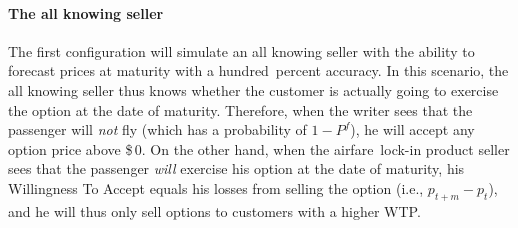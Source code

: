 \paragraph{The all knowing seller}
The first configuration will simulate an all knowing seller with the ability to forecast prices at maturity with a hundred~percent accuracy. In this scenario, the all knowing seller thus knows whether the customer is actually going to exercise the option at the date of maturity. Therefore, when the writer sees that the passenger will \emph{not} fly (which has a probability of $1-P^f$), he will accept any option price above \$\,0. On the other hand, when the airfare~lock-in product seller sees that the passenger \emph{will} exercise his option at the date of maturity, his Willingness To Accept equals his losses from selling the option (i.e., $p_{t+m} - p_t$), and he will thus only sell options to customers with a higher WTP. 


